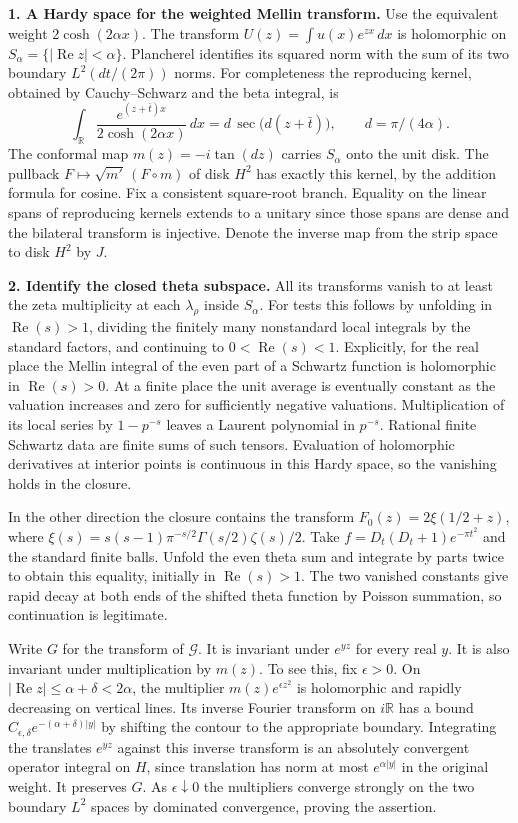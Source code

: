 \documentclass[11pt,letterpaper]{article}
\newcommand{\R}{\mathbb R}
\newcommand{\Gg}{\mathcal G}
\newcommand{\re}{\operatorname{Re}}
\newcommand{\head}[1]{\par\smallskip\textbf{#1}\enspace}
\begin{document}
\head{1. A Hardy space for the weighted Mellin transform.}
Use the equivalent weight $2\cosh(2\alpha x)$. The transform $U(z)=\int u(x)e^{zx}\,dx$ is holomorphic on $S_\alpha=\{|\re z|<\alpha\}$. Plancherel identifies its squared norm with the sum of its two boundary $L^2(dt/(2\pi))$ norms. For completeness the reproducing kernel, obtained by Cauchy--Schwarz and the beta integral, is
\[
 \int_\R\frac{e^{(z+\bar t)x}}{2\cosh(2\alpha x)}\,dx
   =d\,\sec\big(d(z+\bar t)\big),\qquad d=\pi/(4\alpha).
\]
The conformal map $m(z)=-i\tan(dz)$ carries $S_\alpha$ onto the unit disk. The pullback $F\mapsto \sqrt{m'}\,(F\circ m)$ of disk $H^2$ has exactly this kernel, by the addition formula for cosine. Fix a consistent square-root branch. Equality on the linear spans of reproducing kernels extends to a unitary since those spans are dense and the bilateral transform is injective. Denote the inverse map from the strip space to disk $H^2$ by $J$.

\head{2. Identify the closed theta subspace.}
All its transforms vanish to at least the zeta multiplicity at each $\lambda_\rho$ inside $S_\alpha$. For tests this follows by unfolding in $\re(s)>1$, dividing the finitely many nonstandard local integrals by the standard factors, and continuing to $0<\re(s)<1$. Explicitly, for the real place the Mellin integral of the even part of a Schwartz function is holomorphic in $\re(s)>0$. At a finite place the unit average is eventually constant as the valuation increases and zero for sufficiently negative valuations. Multiplication of its local series by $1-p^{-s}$ leaves a Laurent polynomial in $p^{-s}$. Rational finite Schwartz data are finite sums of such tensors. Evaluation of holomorphic derivatives at interior points is continuous in this Hardy space, so the vanishing holds in the closure.

In the other direction the closure contains the transform $F_0(z)=2\xi(1/2+z)$, where $\xi(s)=s(s-1)\pi^{-s/2}\Gamma(s/2)\zeta(s)/2$. Take $f=D_t(D_t+1)e^{-\pi t^2}$ and the standard finite balls. Unfold the even theta sum and integrate by parts twice to obtain this equality, initially in $\re(s)>1$. The two vanished constants give rapid decay at both ends of the shifted theta function by Poisson summation, so continuation is legitimate.

Write $G$ for the transform of $\Gg$. It is invariant under $e^{yz}$ for every real $y$. It is also invariant under multiplication by $m(z)$. To see this, fix $\epsilon>0$. On $|\re z|\le\alpha+\delta<2\alpha$, the multiplier $m(z)e^{\epsilon z^2}$ is holomorphic and rapidly decreasing on vertical lines. Its inverse Fourier transform on $i\R$ has a bound $C_{\epsilon,\delta}e^{-(\alpha+\delta)|y|}$ by shifting the contour to the appropriate boundary. Integrating the translates $e^{yz}$ against this inverse transform is an absolutely convergent operator integral on $H$, since translation has norm at most $e^{\alpha|y|}$ in the original weight. It preserves $G$. As $\epsilon\downarrow0$ the multipliers converge strongly on the two boundary $L^2$ spaces by dominated convergence, proving the assertion.
\end{document}
